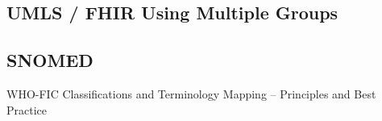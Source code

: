 \subsection{UMLS / FHIR Using Multiple Groups}

\begin{comment}
\bibitem{UMLS FHIR}
``An Interoperable UMLS Terminology Service Using FHIR'' \newline
\url{https://www.mdpi.com/1999-5903/12/11/199}

\bibitem{UMLS FHIR 2}
``Representing UMLS knowledge using FHIR Terminological Resources'' \newline
\url{https://ieeexplore.ieee.org/abstract/document/8983305}
\end{comment}

\subsection{SNOMED}

WHO-FIC Classifications and Terminology Mapping -- Principles and Best Practice 

